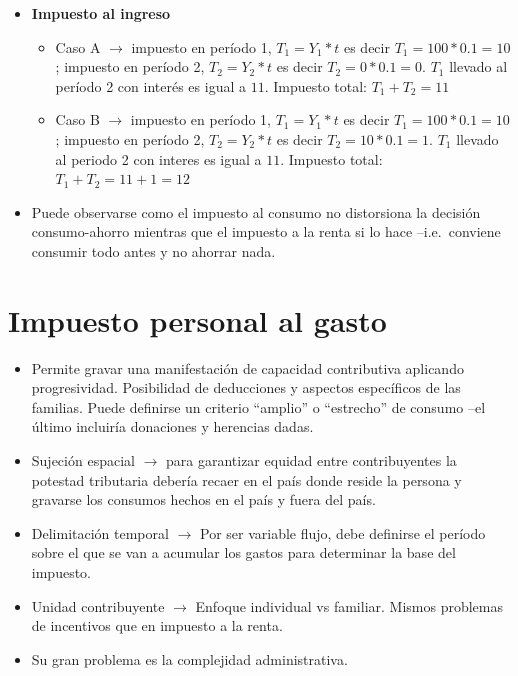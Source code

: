 \documentclass[
  letterpaper,
  DIV=11,
  numbers=noendperiod]{scrartcl}
\providecommand{\tightlist}{%
  \setlength{\itemsep}{0pt}\setlength{\parskip}{0pt}}\usepackage{longtable,booktabs,array}
\begin{document}
\begin{itemize}
\tightlist
\item
  \textbf{Impuesto al ingreso}

  \begin{itemize}
  \tightlist
  \item
    Caso A \(\longrightarrow\) impuesto en período 1, \(T_1=Y_1*t\) es
    decir \(T_1=100*0.1=10\); impuesto en período 2, \(T_2=Y_2*t\) es
    decir \(T_2=0*0.1=0\). \(T_1\) llevado al período 2 con interés es
    igual a \(11\). Impuesto total: \(T_1+T_2=11\)
  \item
    Caso B \(\longrightarrow\) impuesto en período 1, \(T_1=Y_1*t\) es
    decir \(T_1=100*0.1=10\); impuesto en período 2, \(T_2=Y_2*t\) es
    decir \(T_2=10*0.1=1\). \(T_1\) llevado al periodo 2 con interes es
    igual a \(11\). Impuesto total: \(T_1+T_2=11+1=12\)
  \end{itemize}
\item
  Puede observarse como el impuesto al consumo no distorsiona la
  decisión consumo-ahorro mientras que el impuesto a la renta si lo hace
  --i.e.~conviene consumir todo antes y no ahorrar nada.
\end{itemize}

\section{\texorpdfstring{\textbf{Impuesto personal al
gasto}}{Impuesto personal al gasto}}\label{impuesto-personal-al-gasto}

\begin{itemize}
\tightlist
\item
  Permite gravar una manifestación de capacidad contributiva aplicando
  progresividad. Posibilidad de deducciones y aspectos específicos de
  las familias. Puede definirse un criterio ``amplio'' o ``estrecho'' de
  consumo --el último incluiría donaciones y herencias dadas.
\item
  Sujeción espacial \(\longrightarrow\) para garantizar equidad entre
  contribuyentes la potestad tributaria debería recaer en el país donde
  reside la persona y gravarse los consumos hechos en el país y fuera
  del país.
\item
  Delimitación temporal \(\longrightarrow\) Por ser variable flujo, debe
  definirse el período sobre el que se van a acumular los gastos para
  determinar la base del impuesto.
\item
  Unidad contribuyente \(\longrightarrow\) Enfoque individual vs
  familiar. Mismos problemas de incentivos que en impuesto a la renta.
\item
  Su gran problema es la complejidad administrativa.
\end{itemize}
\end{document}

